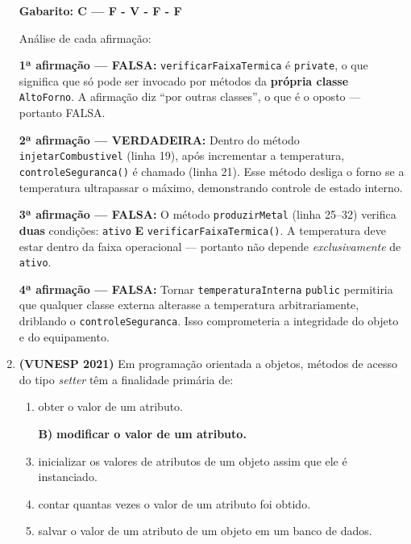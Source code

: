 \documentclass[12pt,a4paper]{article}
\begin{document}
\begin{enumerate}
\begin{tcolorbox}[respostabox]
\textbf{Gabarito: C — F - V - F - F}

Análise de cada afirmação:

\textbf{1ª afirmação — FALSA:} \texttt{verificarFaixaTermica} é \texttt{private}, o que significa que só pode ser invocado por métodos da \textbf{própria classe} \texttt{AltoForno}. A afirmação diz ``por outras classes'', o que é o oposto — portanto FALSA.

\textbf{2ª afirmação — VERDADEIRA:} Dentro do método \texttt{injetarCombustivel} (linha 19), após incrementar a temperatura, \texttt{controleSeguranca()} é chamado (linha 21). Esse método desliga o forno se a temperatura ultrapassar o máximo, demonstrando controle de estado interno.

\textbf{3ª afirmação — FALSA:} O método \texttt{produzirMetal} (linha 25–32) verifica \textbf{duas} condições: \texttt{ativo} \textbf{E} \texttt{verificarFaixaTermica()}. A temperatura deve estar dentro da faixa operacional — portanto não depende \textit{exclusivamente} de \texttt{ativo}.

\textbf{4ª afirmação — FALSA:} Tornar \texttt{temperaturaInterna} \texttt{public} permitiria que qualquer classe externa alterasse a temperatura arbitrariamente, driblando o \texttt{controleSeguranca}. Isso comprometeria a integridade do objeto e do equipamento.
\end{tcolorbox}

\vspace{0.4cm}

\item \textbf{(VUNESP 2021)} Em programação orientada a objetos, métodos de acesso do tipo \textit{setter} têm a finalidade primária de:
    \begin{enumerate}[label=\Alph*)]
        \item obter o valor de um atributo.
        \item[\textbf{B)}] \textbf{modificar o valor de um atributo.} \checkmark
        \item inicializar os valores de atributos de um objeto assim que ele é instanciado.
        \item contar quantas vezes o valor de um atributo foi obtido.
        \item salvar o valor de um atributo de um objeto em um banco de dados.
    \end{enumerate}


\end{enumerate}
\end{document}
